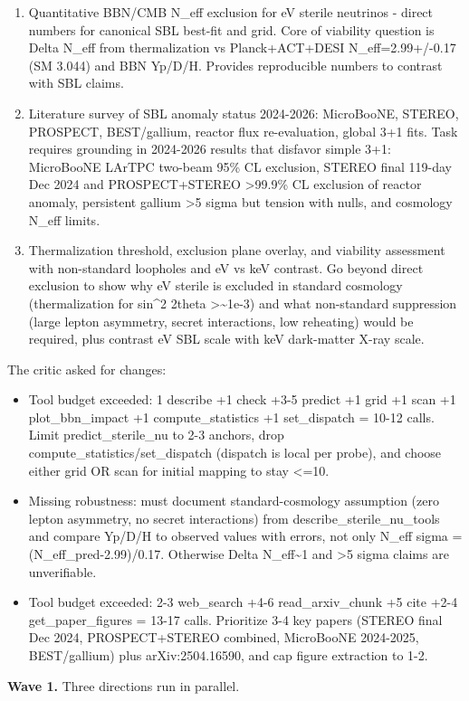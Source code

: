 \documentclass[11pt,a4paper]{article}
\begin{document}
\begin{enumerate}
  \item Quantitative BBN/CMB N\_eff exclusion for eV sterile neutrinos - direct numbers for canonical SBL best-fit and grid. Core of viability question is Delta N\_eff from thermalization vs Planck+ACT+DESI N\_eff=2.99+/-0.17 (SM 3.044) and BBN Yp/D/H. Provides reproducible numbers to contrast with SBL claims.
  \item Literature survey of SBL anomaly status 2024-2026: MicroBooNE, STEREO, PROSPECT, BEST/gallium, reactor flux re-evaluation, global 3+1 fits. Task requires grounding in 2024-2026 results that disfavor simple 3+1: MicroBooNE LArTPC two-beam 95\% CL exclusion, STEREO final 119-day Dec 2024 and PROSPECT+STEREO \textgreater{}99.9\% CL exclusion of reactor anomaly, persistent gallium \textgreater{}5 sigma but tension with nulls, and cosmology N\_eff limits.
  \item Thermalization threshold, exclusion plane overlay, and viability assessment with non-standard loopholes and eV vs keV contrast. Go beyond direct exclusion to show why eV sterile is excluded in standard cosmology (thermalization for sin\textasciicircum{}2 2theta \textgreater{}\textasciitilde{}1e-3) and what non-standard suppression (large lepton asymmetry, secret interactions, low reheating) would be required, plus contrast eV SBL scale with keV dark-matter X-ray scale.
\end{enumerate}
The critic asked for changes:

\begin{itemize}
  \item Tool budget exceeded: 1 describe +1 check +3-5 predict +1 grid +1 scan +1 plot\_bbn\_impact +1 compute\_statistics +1 set\_dispatch = 10-12 calls. Limit predict\_sterile\_nu to 2-3 anchors, drop compute\_statistics/set\_dispatch (dispatch is local per probe), and choose either grid OR scan for initial mapping to stay \textless{}=10.
  \item Missing robustness: must document standard-cosmology assumption (zero lepton asymmetry, no secret interactions) from describe\_sterile\_nu\_tools and compare Yp/D/H to observed values with errors, not only N\_eff sigma = (N\_eff\_pred-2.99)/0.17. Otherwise Delta N\_eff\textasciitilde{}1 and \textgreater{}5 sigma claims are unverifiable.
  \item Tool budget exceeded: 2-3 web\_search +4-6 read\_arxiv\_chunk +5 cite +2-4 get\_paper\_figures = 13-17 calls. Prioritize 3-4 key papers (STEREO final Dec 2024, PROSPECT+STEREO combined, MicroBooNE 2024-2025, BEST/gallium) plus arXiv:2504.16590, and cap figure extraction to 1-2.
\end{itemize}
\textbf{Wave 1.} Three directions run in parallel.
\end{document}
